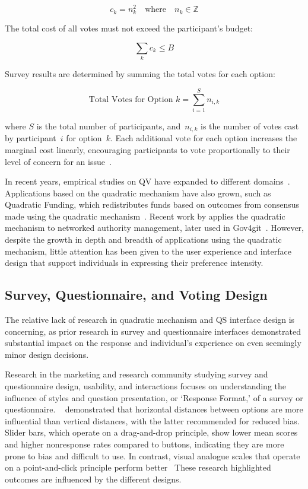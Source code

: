 \[c_k = n_k^2 \quad \text{where}\quad n_k \in \mathbb{Z}\]

The total cost of all votes must not exceed the participant's budget:

\[\sum_k c_k \leq B\]

Survey results are determined by summing the total votes for each option:

\[ \text{Total Votes for Option } k = \sum_{i=1}^{S} n_{i,k} \]

where $S$ is the total number of participants, and~$n_{i,k}$ is the number of votes cast by participant~$i$ for option~$k$. Each additional vote for each option increases the marginal cost linearly, encouraging participants to vote proportionally to their level of concern for an issue~\cite{posner2018radical}.

In recent years, empirical studies on QV have expanded to different domains~\cite{naylor2017first, cavailleWhoCaresMeasuring}. Applications based on the quadratic mechanism have also grown, such as Quadratic Funding, which redistributes funds based on outcomes from consensus made using the quadratic mechanism~\cite{buterinFlexibleDesignFunding2019a, freitasQuadraticFundingIncomplete2024}. Recent work by \textcite{southPluralManagement2024} applies the quadratic mechanism to networked authority management, later used in Gov4git~\cite{Gov4gitDecentralizedPlatform2023}. However, despite the growth in depth and breadth of applications using the quadratic mechanism, little attention has been given to the user experience and interface design that support individuals in expressing their preference intensity.

\subsection{Survey, Questionnaire, and Voting Design}
The relative lack of research in quadratic mechanism and QS interface design is concerning, as prior research in survey and questionnaire interfaces demonstrated substantial impact on the response and individual's experience on even seemingly minor design decisions. 

Research in the marketing and research community studying survey and questionnaire design, usability, and interactions focuses on understanding the influence of styles and question presentation, or `Response Format,' of a survey or questionnaire. ~\textcite{weijtersExtremityHorizontalVertical2021} demonstrated that horizontal distances between options are more influential than vertical distances, with the latter recommended for reduced bias. Slider bars, which operate on a drag-and-drop principle, show lower mean scores and higher nonresponse rates compared to buttons, indicating they are more prone to bias and difficult to use. In contrast, visual analogue scales that operate on a point-and-click principle perform better~\cite{toepoelSlidersVisualAnalogue2018} These research highlighted outcomes are influenced by the different designs.

